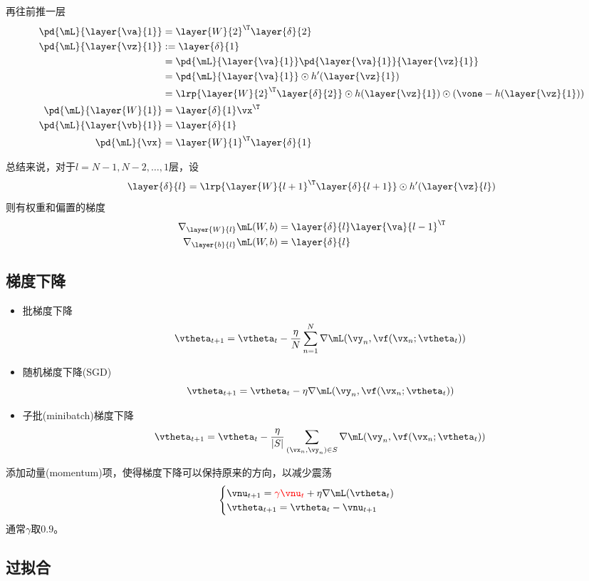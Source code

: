 再往前推一层
\[\begin{aligned}
\pd{\mL}{\layer{\va}{1}}
&=\layer{W}{2}^\T\layer{\delta}{2}\\
\pd{\mL}{\layer{\vz}{1}}
&:=\layer{\delta}{1}\\
&=\pd{\mL}{\layer{\va}{1}}\pd{\layer{\va}{1}}{\layer{\vz}{1}}\\
&=\pd{\mL}{\layer{\va}{1}}\odot h'(\layer{\vz}{1})\\
&=\lrp{\layer{W}{2}^\T\layer{\delta}{2}}\odot h(\layer{\vz}{1})\odot (\vone-h(\layer{\vz}{1}))\\
\pd{\mL}{\layer{W}{1}}&=\layer{\delta}{1}\vx^\T\\
\pd{\mL}{\layer{\vb}{1}}&=\layer{\delta}{1}\\
\pd{\mL}{\vx}&=\layer{W}{1}^\T\layer{\delta}{1}
\end{aligned}\]

总结来说，对于$l=N-1,N-2,\ldots,1$层，设\textcolor{red}{
\[\layer{\delta}{l}=\lrp{\layer{W}{l+1}^\T\layer{\delta}{l+1}}\odot h'(\layer{\vz}{l})\]
}
则有权重和偏置的梯度\textcolor{red}{
\[\begin{aligned}
\nabla_{\layer{W}{l}}\mL(W,b)&=\layer{\delta}{l}\layer{\va}{l-1}^\T\\
\nabla_{\layer{b}{l}}\mL(W,b)&=\layer{\delta}{l}
\end{aligned}\]
}

\subsection{梯度下降}
\begin{itemize}
    \item 批梯度下降
    \[\vtheta_{t+1}=\vtheta_t-\frac{\eta}{N}\sum_{n=1}^N\nabla\mL(\vy_n,\vf(\vx_n;\vtheta_t))\]
    \item 随机梯度下降(SGD)
    \[\vtheta_{t+1}=\vtheta_t-\eta\nabla\mL(\vy_n,\vf(\vx_n;\vtheta_t))\]
    \item 子批(minibatch)梯度下降
    \[\vtheta_{t+1}=\vtheta_t-\frac{\eta}{|S|}\sum_{(\vx_n,\vy_n)\in S}\nabla\mL(\vy_n,\vf(\vx_n;\vtheta_t))\]
\end{itemize}

添加动量(momentum)项，使得梯度下降可以保持原来的方向，以减少震荡
\[\begin{cases}
    \vnu_{t+1}=\textcolor{red}{\gamma\vnu_t}+\eta\nabla\mL(\vtheta_t)\\
    \vtheta_{t+1}=\vtheta_t-\vnu_{t+1}
\end{cases}\]
通常$\gamma$取$0.9$。

\subsection{过拟合}